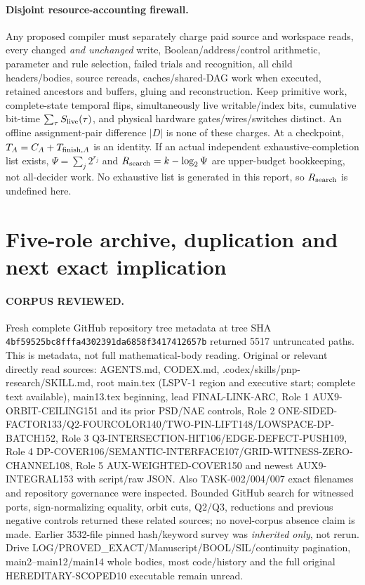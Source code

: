 \documentclass[11pt]{article}
\begin{document}
\paragraph{Disjoint resource-accounting firewall.}
Any proposed compiler must separately charge paid source and workspace reads, every changed \emph{and unchanged} write, Boolean/address/control arithmetic, parameter and rule selection, failed trials and recognition, all child headers/bodies, source rereads, caches/shared-DAG work when executed, retained ancestors and buffers, gluing and reconstruction. Keep primitive work, complete-state temporal flips, simultaneously live writable/index bits, cumulative bit-time $\sum_\tau S_{\rm live}(\tau)$, and physical hardware gates/wires/switches distinct. An offline assignment-pair difference $|D|$ is none of these charges. At a checkpoint, $T_A=C_A+T_{{\rm finish},A}$ is an identity. If an actual independent exhaustive-completion list exists, $\Psi=\sum_j2^{r_j}$ and $R_{\rm search}=k-\log_2\Psi$ are upper-budget bookkeeping, not all-decider work. No exhaustive list is generated in this report, so $R_{\rm search}$ is undefined here.

\section{Five-role archive, duplication and next exact implication}
\paragraph{CORPUS REVIEWED.}
Fresh complete GitHub repository tree metadata at tree SHA
\texttt{4bf59525bc8fffa4302391da6858f3417412657b}
returned 5517 untruncated paths. This is metadata, not full mathematical-body reading. Original or relevant directly read sources: AGENTS.md, CODEX.md, .codex/skills/pnp-research/SKILL.md, root main.tex (LSPV-1 region and executive start; complete text available), main13.tex beginning, lead FINAL-LINK-ARC, Role 1 AUX9-ORBIT-CEILING151 and its prior PSD/NAE controls, Role 2 ONE-SIDED-FACTOR133/Q2-FOURCOLOR140/TWO-PIN-LIFT148/LOWSPACE-DP-BATCH152, Role 3 Q3-INTERSECTION-HIT106/EDGE-DEFECT-PUSH109, Role 4 DP-COVER106/SEMANTIC-INTERFACE107/GRID-WITNESS-ZERO-CHANNEL108, Role 5 AUX-WEIGHTED-COVER150 and newest AUX9-INTEGRAL153 with script/raw JSON. Also TASK-002/004/007 exact filenames and repository governance were inspected. Bounded GitHub search for witnessed ports, sign-normalizing equality, orbit cuts, Q2/Q3, reductions and previous negative controls returned these related sources; no novel-corpus absence claim is made. Earlier 3532-file pinned hash/keyword survey was \emph{inherited only}, not rerun. Drive LOG/PROVED\_EXACT/Manuscript/BOOL/SIL/continuity pagination, main2--main12/main14 whole bodies, most code/history and the full original HEREDITARY-SCOPED10 executable remain unread.
\end{document}
